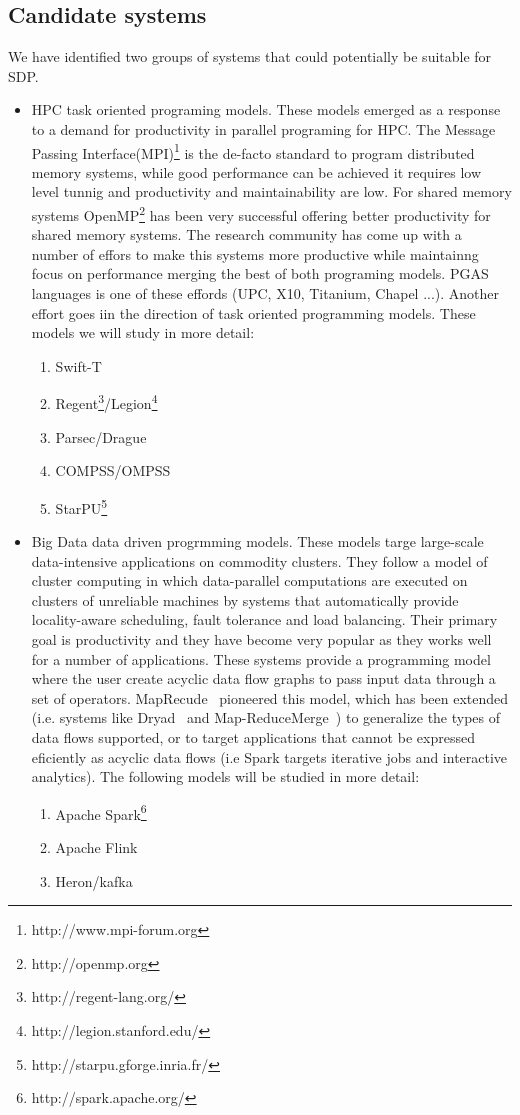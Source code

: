 \subsection{Candidate systems}
We have identified two groups of systems that could potentially be suitable for SDP. 
\begin{itemize}
\item HPC task oriented programing models. These models emerged as a response to a demand for productivity in parallel programing for HPC.
The Message Passing Interface(MPI)\footnote{http://www.mpi-forum.org} is the de-facto standard to program distributed memory systems, while good 
performance can be achieved it requires low level tunnig and productivity and maintainability are low. For shared memory systems
OpenMP\footnote{http://openmp.org} has been very successful offering better productivity for shared memory systems. The research community 
has come up with a number of effors to make this systems more productive while maintainng focus on performance merging the best of both programing models. 
PGAS languages is one of these effords (UPC, X10, Titanium, Chapel ...). Another effort goes iin the direction of task oriented programming 
models. These models we will study in more detail: 
\begin{enumerate}
\item Swift-T 
\item Regent\footnote{http://regent-lang.org/}/Legion\footnote{http://legion.stanford.edu/}
\item Parsec/Drague
\item COMPSS/OMPSS
\item StarPU\footnote{http://starpu.gforge.inria.fr/}
\end{enumerate}
\item Big Data data driven progrmming models. These models targe large-scale data-intensive applications on commodity clusters. 
They follow a model of cluster computing in which data-parallel computations are
executed on clusters of unreliable machines by systems that automatically provide locality-aware scheduling, fault tolerance and load balancing. 
Their primary goal is productivity and they have become very popular as they works well for a number of applications. 
These systems provide a programming model where the user create acyclic data flow graphs to pass input data through a set of operators. 
MapRecude~\cite{mapReduce} pioneered this model, which has been extended (i.e. systems like Dryad~\cite{Dryad} and Map-ReduceMerge~\cite{mapReduceMerge}) to generalize the types of data flows supported, or to target applications that cannot be expressed eficiently as acyclic data flows (i.e Spark targets iterative jobs and interactive analytics).
The following models will be studied in more detail:
\begin{enumerate}
\item Apache Spark\footnote{http://spark.apache.org/}
\item Apache Flink
\item Heron/kafka
\end{enumerate}

\end{itemize}

